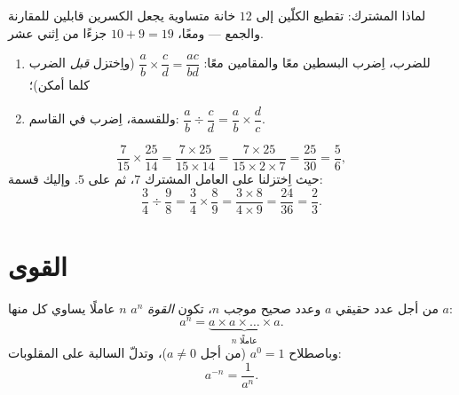 \begin{omfigure}

{\small لماذا  المشترك: تقطيع الكلّين إلى $12$ خانة
متساوية يجعل الكسرين قابلين للمقارنة والجمع --- ومعًا،
$10 + 9 = 19$ جزءًا من اِثني عشر.}
\end{omfigure}

\begin{method}\label{met:g9:fractions:mult}
\begin{enumerate}
  \item للضرب، اِضرب البسطين معًا والمقامين
        معًا: $\dfrac ab \times \dfrac cd = \dfrac{ac}{bd}$
        (واِختزل \emph{قبل} الضرب كلما أمكن)؛
  \item وللقسمة، اِضرب في  القاسم:
        $\dfrac ab \div \dfrac cd = \dfrac ab \times \dfrac dc$.
\end{enumerate}
\end{method}

\begin{example}\label{ex:g9:fractions:mult}
\[
\frac{7}{15} \times \frac{25}{14}
= \frac{7 \times 25}{15 \times 14}
= \frac{7 \times 25}{15 \times 2 \times 7}
= \frac{25}{30} = \frac56,
\]
حيث اِختزلنا على العامل المشترك $7$، ثم على $5$. وإليك
قسمة:
\[
\frac{3}{4} \div \frac{9}{8}
= \frac34 \times \frac89
= \frac{3 \times 8}{4 \times 9}
= \frac{24}{36} = \frac23 .
\]
\end{example}

\section{القوى}

\begin{definition}[القوة]\label{def:g9:fractions:power}
من أجل عدد حقيقي $a$ وعدد صحيح موجب $n$، تكون
\emph{القوة} $a^n$  $n$ عاملًا يساوي كل منها
$a$:
\[
a^n = \underbrace{a \times a \times \dots \times a}_{n \text{ عاملًا}} .
\]
وباصطلاح $a^0 = 1$ (من أجل $a \neq 0$)، وتدلّ  السالبة على
المقلوبات:
\[
a^{-n} = \frac{1}{a^n}.
\]
\end{definition}

